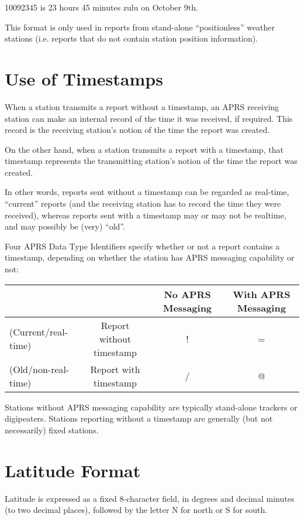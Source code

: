 10092345 is 23 hours 45 minutes zulu on October 9th.

This format is only used in reports from stand-alone “positionless” weather
stations (i.e. reports that do not contain station position information).

\section{Use of Timestamps}

When a station transmits a report without a timestamp, an APRS receiving
station can make an internal record of the time it was received, if required.
This record is the receiving station’s notion of the time the report was
created.

On the other hand, when a station transmits a report with a timestamp, that
timestamp represents the transmitting station’s notion of the time the report
was created.

In other words, reports sent without a timestamp can be regarded as
real-time, “current” reports (and the receiving station has to record
the time they were received), whereas reports sent with a timestamp
may or may not be realtime, and may possibly be (very) “old”.

Four APRS Data Type Identifiers specify whether or not a report
contains a timestamp, depending on whether the station has APRS
messaging capability or not:


\begin{tabular} {|l|c|c|c|}
  \hline \hline
  & & No APRS Messaging & With APRS Messaging \\
  \hline
  (Current/real-time) & Report without timestamp & ! & =  \\
  \hline
  (Old/non-real-time) & Report with timestamp & / & @ \\
  \hline \hline
\end{tabular}

Stations without APRS messaging capability are typically stand-alone
trackers or digipeaters. Stations reporting without a timestamp are generally
(but not necessarily) fixed stations.

\section{Latitude Format}

Latitude is expressed as a fixed 8-character field, in degrees and decimal
minutes (to two decimal places), followed by the letter N for north or S for
south.

